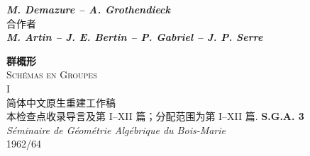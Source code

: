 

\frontmatter
\begin{titlepage}
\thispagestyle{empty}
\begin{flushright}
{\Large\bfseries\itshape M. Demazure -- A. Grothendieck}\\[.7em]
{\small 合作者}\\[.4em]
{\large\bfseries\itshape M. Artin -- J. E. Bertin -- P. Gabriel -- J. P. Serre}
\end{flushright}
\vspace{30mm}
\begin{center}
{\fontsize{38}{48}\selectfont\bfseries 群概形}\\[1em]
{\Large\scshape Sch\'emas en Groupes}\\[.7em]
{\Huge I}\\[1.7em]
{\large 简体中文原生重建工作稿}\\[.5em]
{\small 本检查点收录导言及第 I--XII 篇；分配范围为第 I--XII 篇.}
\vfill
{\huge\bfseries S.G.A. 3}\\[.7em]
{\large\itshape S\'eminaire de G\'eom\'etrie Alg\'ebrique du Bois-Marie}\\[.5em]
{\Large 1962/64}
\end{center}
\end{titlepage}

\tableofcontents
\mainmatter











\makeatletter
\providecommand{\SGAThreeNativeInput}[2][0.92\textwidth]{%
  \begin{adjustbox}{max width=#1,center,varwidth=\maxdimen}%
  \end{adjustbox}%
}
\providecommand{\SGAThreeNativeDiagram}[5][0.92\textwidth]{%
  \begin{figure}[H]
    \centering
    \SGAThreeNativeInput[#1]{#2}%
    \caption{#3}
    \label{#4}
    \par\smallskip
    {\footnotesize\itshape 原生 \TeX{} 重建; 来源定位: #5.}
  \end{figure}%
}
\makeatother
{}






